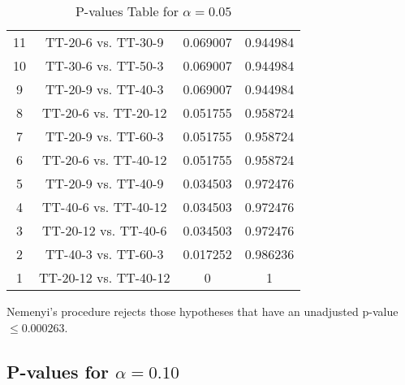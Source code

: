 \documentclass[a4paper,10pt]{article}
\begin{document}
\begin{landscape}
\begin{table}[!htp]
\begin{tabular}{cccc}
11&TT-20-6 vs. TT-30-9&0.069007&0.944984\\
10&TT-30-6 vs. TT-50-3&0.069007&0.944984\\
9&TT-20-9 vs. TT-40-3&0.069007&0.944984\\
8&TT-20-6 vs. TT-20-12&0.051755&0.958724\\
7&TT-20-9 vs. TT-60-3&0.051755&0.958724\\
6&TT-20-6 vs. TT-40-12&0.051755&0.958724\\
5&TT-20-9 vs. TT-40-9&0.034503&0.972476\\
4&TT-40-6 vs. TT-40-12&0.034503&0.972476\\
3&TT-20-12 vs. TT-40-6&0.034503&0.972476\\
2&TT-40-3 vs. TT-60-3&0.017252&0.986236\\
1&TT-20-12 vs. TT-40-12&0&1\\
\hline
\end{tabular}
\caption{P-values Table for $\alpha=0.05$}
\end{table}Nemenyi's procedure rejects those hypotheses that have an unadjusted p-value $\le0.000263$.

\pagebreak

\subsection{P-values for $\alpha=0.10$}


\end{landscape}
\end{document}
